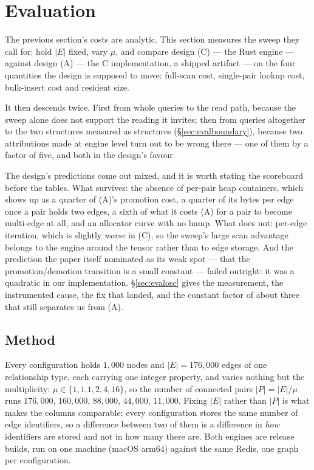 \documentclass[11pt,a4paper]{article}
\theoremstyle{plain}
\theoremstyle{definition}
\theoremstyle{remark}
\begin{document}
\section{Evaluation}
\label{sec:eval}

The previous section's costs are analytic. This section measures the sweep they
call for: hold $|E|$ fixed, vary $\mu$, and compare design (C) --- the Rust
engine --- against design (A) --- the C implementation, a shipped artifact ---
on the four quantities the design is supposed to move: full-scan cost,
single-pair lookup cost, bulk-insert cost and resident size.

It then descends twice. First from whole queries to the read path, because the
sweep alone does not support the reading it invites; then from queries
altogether to the two structures measured as structures
(\S\ref{sec:evalboundary}), because two attributions made at engine level turn
out to be wrong there --- one of them by a factor of five, and both in the
design's favour.

The design's predictions come out mixed, and it is worth stating the scoreboard
before the tables. What survives: the absence of per-pair heap containers, which
shows up as a quarter of (A)'s promotion cost, a quarter of its bytes per edge
once a pair holds two edges, a sixth of what it costs (A) for a pair to become
multi-edge at all, and an allocator curve with no hump. What does not: per-edge
iteration, which is slightly \emph{worse} in (C), so the sweep's large scan
advantage belongs to the engine around the tensor rather than to edge storage.
And the prediction the paper itself nominated as its weak spot --- that the
promotion/demotion transition is a small constant --- failed outright: it was a
quadratic in our implementation. \S\ref{sec:evalosc} gives the measurement, the
instrumented cause, the fix that landed, and the constant factor of about three
that still separates us from (A).

\subsection{Method}
\label{sec:evalmethod}

Every configuration holds $1{,}000$ nodes and $|E| = 176{,}000$ edges of one
relationship type, each carrying one integer property, and varies nothing but
the multiplicity: $\mu \in \{1, 1.1, 2, 4, 16\}$, so the number of connected
pairs $|P| = |E|/\mu$ runs $176{,}000$, $160{,}000$, $88{,}000$, $44{,}000$,
$11{,}000$. Fixing $|E|$ rather than $|P|$ is what makes the columns
comparable: every configuration stores the same number of edge identifiers, so
a difference between two of them is a difference in \emph{how} identifiers are
stored and not in how many there are. Both engines are release builds, run on
one machine (macOS arm64) against the same Redis, one graph per configuration.
\end{document}
